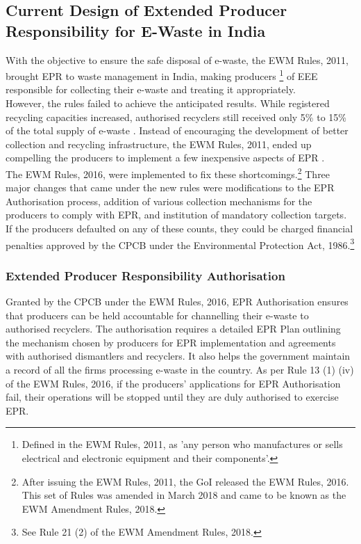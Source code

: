 \documentclass[a4paper, 12pt]{article}
\begin{document}
\subsection{Current Design of Extended Producer Responsibility for E-Waste in India}
                    
                    With the objective to ensure the safe disposal of e-waste, the EWM Rules, 2011, brought EPR to waste management in India, making producers \footnote{Defined in the EWM Rules, 2011, as 'any person who manufactures or sells electrical and electronic equipment and their components'.} of EEE responsible for collecting their e-waste and treating it appropriately. \\
                    
                    However, the rules failed to achieve the anticipated results. While registered recycling capacities increased, authorised recyclers still received only 5\% to 15\% of the total supply of e-waste \parencite{bhaskarturagapapera}. Instead of encouraging the development of better collection and recycling infrastructure, the EWM Rules, 2011, ended up compelling the producers to implement a few inexpensive aspects of EPR \parencite{bhaskarturagapapera}. \\
                    
                    The EWM Rules, 2016, were implemented to fix these shortcomings.\footnote{After issuing the EWM Rules, 2011, the GoI released the EWM Rules, 2016. This set of Rules was amended in March 2018 and came to be known as the EWM Amendment Rules, 2018.} Three major changes that came under the new rules were modifications to the EPR Authorisation process, addition of various collection mechanisms for the producers to comply with EPR, and institution of mandatory collection targets. If the producers defaulted on any of these counts, they could be charged financial penalties approved by the CPCB under the Environmental Protection Act, 1986.\footnote{See Rule 21 (2) of the EWM Amendment Rules, 2018.}

\subsubsection{Extended Producer Responsibility Authorisation}
                    
                    Granted by the CPCB under the EWM Rules, 2016, EPR Authorisation ensures that producers can be held accountable for channelling their e-waste to authorised recyclers. The authorisation requires a detailed EPR Plan outlining the mechanism chosen by producers for EPR implementation and agreements with authorised dismantlers and recyclers. It also helps the government maintain a record of all the firms processing e-waste in the country. As per Rule 13 (1) (iv) of the EWM Rules, 2016, if the producers’ applications for EPR Authorisation fail, their operations will be stopped until they are duly authorised to exercise EPR. 
                 
\end{document}
